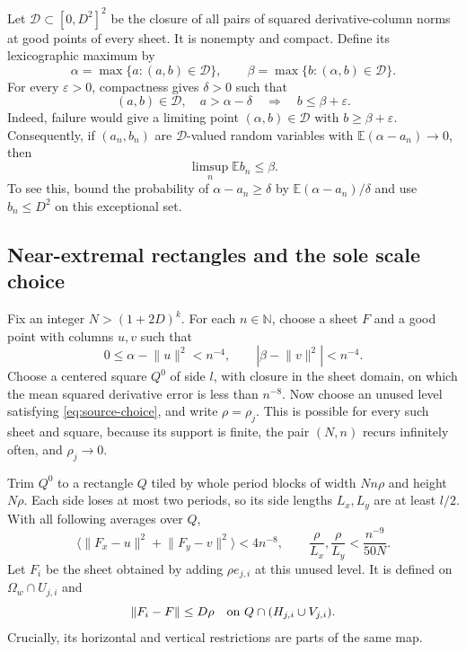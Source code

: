 \documentclass[11pt]{article}
\theoremstyle{remark}
\newcommand{\N}{\mathbb N}
\newcommand{\norm}[1]{\lVert#1\rVert}
\newcommand{\av}[1]{\langle#1\rangle}
\begin{document}
Let $\mathcal D\subset[0,D^2]^2$ be the closure of all pairs of squared derivative-column norms at good points of every sheet. It is nonempty and compact. Define its lexicographic maximum by
\[
 \alpha=\max\{a:(a,b)\in\mathcal D\},\qquad
 \beta=\max\{b:(\alpha,b)\in\mathcal D\}.
\]
For every $\varepsilon>0$, compactness gives $\delta>0$ such that
\[
 (a,b)\in\mathcal D,\quad a>\alpha-\delta
 \quad\Longrightarrow\quad b\le\beta+\varepsilon.
\]
Indeed, failure would give a limiting point $(\alpha,b)\in\mathcal D$ with $b\ge\beta+\varepsilon$. Consequently, if $(a_n,b_n)$ are $\mathcal D$-valued random variables with $\mathbb E(\alpha-a_n)\to0$, then
\begin{equation}\label{eq:lex}
 \limsup_n\mathbb E b_n\le\beta.
\end{equation}
To see this, bound the probability of $\alpha-a_n\ge\delta$ by $\mathbb E(\alpha-a_n)/\delta$ and use $b_n\le D^2$ on this exceptional set.

\subsection{Near-extremal rectangles and the sole scale choice}
Fix an integer $N>(1+2D)^k$. For each $n\in\N$, choose a sheet $F$ and a good point with columns $u,v$ such that
\[
 0\le\alpha-\norm u^2<n^{-4},\qquad
 |\beta-\norm v^2|<n^{-4}.
\]
Choose a centered square $Q^0$ of side $l$, with closure in the sheet domain, on which the mean squared derivative error is less than $n^{-8}$. Now choose an unused level satisfying \eqref{eq:source-choice}, and write $\rho=\rho_j$. This is possible for every such sheet and square, because its support is finite, the pair $(N,n)$ recurs infinitely often, and $\rho_j\to0$.

Trim $Q^0$ to a rectangle $Q$ tiled by whole period blocks of width $Nn\rho$ and height $N\rho$. Each side loses at most two periods, so its side lengths $L_x,L_y$ are at least $l/2$. With all following averages over $Q$,
\begin{equation}\label{eq:appendix-error}
 \av{\norm{F_x-u}^2+\norm{F_y-v}^2}<4n^{-8},
 \qquad \frac{\rho}{L_x},\frac{\rho}{L_y}<\frac{n^{-9}}{50N}.
\end{equation}
Let $F_i$ be the sheet obtained by adding $\rho e_{j,i}$ at this unused level. It is defined on $\Omega_w\cap U_{j,i}$ and
\begin{equation}\label{eq:offset}
 \norm{F_i-F}\le D\rho
 \quad\hbox{on }Q\cap(H_{j,i}\cup V_{j,i}).
\end{equation}
Crucially, its horizontal and vertical restrictions are parts of the same map.
\end{document}
